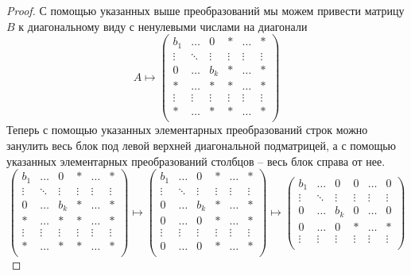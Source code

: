 \begin{proof}
С помощью указанных выше преобразований мы можем привести матрицу $B$ к диагональному виду с ненулевыми числами на диагонали
\[
A \mapsto
\begin{pmatrix}
{b_1}&{\ldots}&{0}&{*}&{\ldots}&{*}\\
{\vdots}&{\ddots}&{\vdots}&{\vdots}&{\vdots}&{\vdots}\\
{0}&{\ldots}&{b_k}&{*}&{\ldots}&{*}\\
{*}&{\ldots}&{*}&{*}&{\ldots}&{*}\\
{\vdots}&{\vdots}&{\vdots}&{\vdots}&{\vdots}&{\vdots}\\
{*}&{\ldots}&{*}&{*}&{\ldots}&{*}\\
\end{pmatrix}
\]
Теперь с помощью указанных элементарных преобразований строк можно занулить весь блок под левой верхней диагональной подматрицей, а с помощью указанных элементарных преобразований столбцов -- весь блок справа от нее.
\[
\begin{pmatrix}
{b_1}&{\ldots}&{0}&{*}&{\ldots}&{*}\\
{\vdots}&{\ddots}&{\vdots}&{\vdots}&{\vdots}&{\vdots}\\
{0}&{\ldots}&{b_k}&{*}&{\ldots}&{*}\\
{*}&{\ldots}&{*}&{*}&{\ldots}&{*}\\
{\vdots}&{\vdots}&{\vdots}&{\vdots}&{\vdots}&{\vdots}\\
{*}&{\ldots}&{*}&{*}&{\ldots}&{*}\\
\end{pmatrix}
\mapsto
\begin{pmatrix}
{b_1}&{\ldots}&{0}&{*}&{\ldots}&{*}\\
{\vdots}&{\ddots}&{\vdots}&{\vdots}&{\vdots}&{\vdots}\\
{0}&{\ldots}&{b_k}&{*}&{\ldots}&{*}\\
{0}&{\ldots}&{0}&{*}&{\ldots}&{*}\\
{\vdots}&{\vdots}&{\vdots}&{\vdots}&{\vdots}&{\vdots}\\
{0}&{\ldots}&{0}&{*}&{\ldots}&{*}\\
\end{pmatrix}
\mapsto
\begin{pmatrix}
{b_1}&{\ldots}&{0}&{0}&{\ldots}&{0}\\
{\vdots}&{\ddots}&{\vdots}&{\vdots}&{\vdots}&{\vdots}\\
{0}&{\ldots}&{b_k}&{0}&{\ldots}&{0}\\
{0}&{\ldots}&{0}&{*}&{\ldots}&{*}\\
{\vdots}&{\vdots}&{\vdots}&{\vdots}&{\vdots}&{\vdots}\\

\end{pmatrix}\]
\end{proof}
